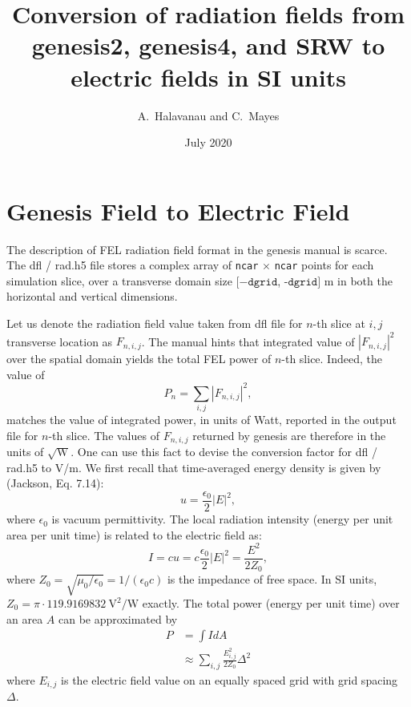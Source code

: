 \documentclass{article}
\title{Conversion of radiation fields from genesis2, genesis4, and SRW to electric fields in SI units}
\author{A.~Halavanau and C.~Mayes}
\date{July 2020}
\begin{document}
\maketitle



\section{Genesis Field to Electric Field}
The description of FEL radiation field format in the {\sc genesis} manual is scarce. The {\sc dfl} / {\sc rad.h5} file stores a complex array of \texttt{ncar} $\times$ \texttt{ncar} points for each simulation slice, over a transverse domain size $[-\texttt{dgrid}$, -$\texttt{dgrid}]$ m in both the horizontal and vertical dimensions.

Let us denote the radiation field value taken from {\sc dfl} file for $n$-th slice at $i,j$ transverse location as $F_{n,i,j}$.
The manual hints that integrated value of $|F_{n,i,j}|^2$ over the spatial domain yields the total FEL power of $n$-th slice.
Indeed, the value of 
\begin{equation}
P_n = \sum_{i,j}{|F_{n,i,j}|^2},
\end{equation}
 matches the value of integrated power, in units of Watt, reported in the output file for $n$-th slice. The values of $F_{n,i,j}$ returned by {\sc genesis} are therefore in the units of $\sqrt{\textrm{W}}$. 
 One can use this fact to devise the conversion factor for {\sc dfl} / {\sc rad.h5} to V/m.
We first recall that time-averaged energy density is given by (Jackson, Eq. 7.14):
\begin{equation}
    u = \frac{\epsilon_0}{2} |E|^2,
\end{equation}
where $\epsilon_0$ is vacuum permittivity. The local
radiation intensity (energy per unit area per unit time) is related to the electric field as:
\begin{equation}
    I = c u = c \frac{\epsilon_0}{2} |E|^2 = \frac{E^2}{2 Z_0},
\end{equation}
where $Z_0 = \sqrt{\mu_0/\epsilon_0} =  1/(\epsilon_0 c)$ is the impedance of free space. In SI units, $Z_0 = \pi\cdot119.9169832  ~\textrm{V}^2/\textrm{W}$ exactly.  The total power (energy per unit time) over an area $A$ can be approximated by
\begin{align*}
    P &= \int I dA \\
      &\approx \sum_{i,j}  \frac{E_{i,j}^2}{2 Z_0} \Delta^2
\end{align*}
where $E_{i,j}$ is the electric field value on an equally spaced grid with grid spacing $\Delta$.
\end{document}
